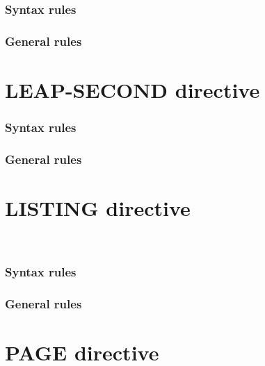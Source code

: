 \subsubsection{Syntax rules}

\subsubsection{General rules}

\section{LEAP-SECOND directive}

\begin{syntax}
\end{syntax}

\subsubsection{Syntax rules}

\subsubsection{General rules}

\section{LISTING directive}

\begin{syntax}
  \directiveindicator{}
  \begin{1=}
     \\
  \end{1=}
\end{syntax}

\subsubsection{Syntax rules}

\subsubsection{General rules}

\section{PAGE directive}

